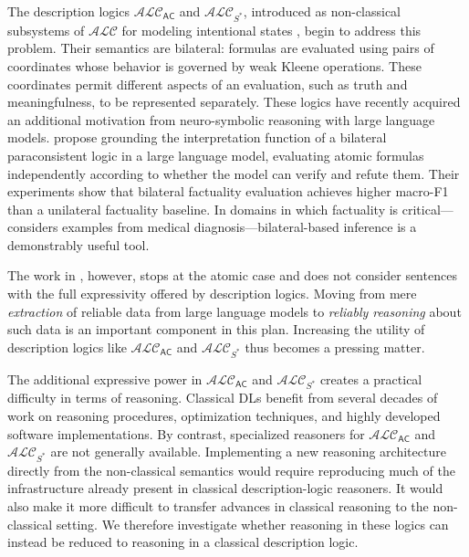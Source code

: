 \documentclass[letterpaper]{article} %
\theoremstyle{definition}
\theoremstyle{definition}
\theoremstyle{definition}
\theoremstyle{definition}
\theoremstyle{definition}
\begin{document}
The description logics $\mathcal{ALC}_\mathsf{AC}$ and $\mathcal{ALC}_{S^\ast}$, introduced as non-classical subsystems of $\mathcal{ALC}$ for modeling intentional states \cite{DBLP:conf/dlog/Ferguson21}, begin to address this problem. Their semantics are bilateral: formulas are evaluated using pairs of coordinates whose behavior is governed by weak Kleene operations. These coordinates permit different aspects of an evaluation, such as truth and meaningfulness, to be represented separately. These logics have recently acquired an additional motivation from neuro-symbolic reasoning with large language models. \cite{DBLP:conf/nesy/AllenCFIG25} propose grounding the interpretation function of a bilateral paraconsistent logic in a large language model, evaluating atomic formulas independently according to whether the model can verify and refute them. Their experiments show that bilateral factuality evaluation achieves higher macro-F1 than a unilateral factuality baseline. In domains in which factuality is critical---\cite{DBLP:conf/nesy/AllenCFIG25} considers examples from medical diagnosis---bilateral-based inference is a demonstrably useful tool.

The work in \cite{DBLP:conf/nesy/AllenCFIG25}, however, stops at the atomic case and does not consider sentences with the full expressivity offered by description logics. Moving from mere \emph{extraction} of reliable data from large language models to \emph{reliably reasoning} about such data is an important component in this plan. Increasing the utility of description logics like $\mathcal{ALC}_\mathsf{AC}$ and $\mathcal{ALC}_{S^\ast}$ thus becomes a pressing matter. 







The additional expressive power in $\mathcal{ALC}_\mathsf{AC}$ and $\mathcal{ALC}_{S^\ast}$ creates a practical difficulty in terms of reasoning. Classical DLs benefit from several decades of work on reasoning procedures, optimization techniques, and highly developed software implementations. By contrast, specialized reasoners for $\mathcal{ALC}_\mathsf{AC}$ and $\mathcal{ALC}_{S^\ast}$ are not generally available. Implementing a new reasoning architecture directly from the non-classical semantics would require reproducing much of the infrastructure already present in classical description-logic reasoners. It would also make it more difficult to transfer advances in classical reasoning to the non-classical setting. We therefore investigate whether reasoning in these logics can instead be reduced to reasoning in a classical description logic. 
\end{document}
